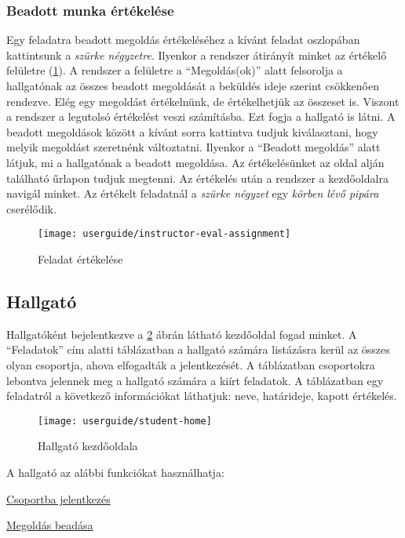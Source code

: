 \subsubsection{Beadott munka értékelése}
\label{step:instructor-eval}
Egy feladatra beadott megoldás értékeléséhez a kívánt feladat oszlopában kattintsunk a \emph{szürke négyzetre}. Ilyenkor a rendszer átirányít minket az értékelő felületre (\ref{fig:instructor-eval-assignment}). A rendszer a felületre a ``Megoldás(ok)'' alatt felsorolja a hallgatónak az összes beadott megoldását a beküldés ideje szerint csökkenően rendezve. Elég egy megoldást értékelnünk, de értékelhetjük az összeset is. Viszont a rendszer a legutolsó értékelést veszi számításba. Ezt fogja a hallgató is látni. A beadott megoldások között a kívánt sorra kattintva tudjuk kiválasztani, hogy melyik megoldást szeretnénk változtatni. Ilyenkor a ``Beadott megoldás'' alatt látjuk, mi a hallgatónak a beadott megoldása. Az értékelésünket az oldal alján található űrlapon tudjuk megtenni. Az értékelés után a rendszer a kezdőoldalra navigál minket. Az értékelt feladatnál a \emph{szürke négyzet} egy \emph{körben lévő pipára} cserélődik.
\begin{figure}[H]
	\centering
	\texttt{[image: userguide/instructor-eval-assignment]}
	\caption{Feladat értékelése}
	\label{fig:instructor-eval-assignment}
\end{figure}
\subsection{Hallgató}
\label{step:student-role}
Hallgatóként bejelentkezve a \ref{fig:student-home} ábrán látható kezdőoldal fogad minket. A ``Feladatok'' cím alatti táblázatban a hallgató számára listázásra kerül az összes olyan csoportja, ahova elfogadták a jelentkezését. A táblázatban csoportokra lebontva jelennek meg a hallgató számára a kiírt feladatok. A táblázatban egy feladatról a következő információkat láthatjuk: neve, határideje, kapott értékelés.
\begin{figure}[H]
	\centering
	\texttt{[image: userguide/student-home]}
	\caption{Hallgató kezdőoldala}
	\label{fig:student-home}
\end{figure}
A hallgató az alábbi funkciókat használhatja:
\begin{compactitem}
    \item \hyperref[step:student-course-reg]{Csoportba jelentkezés}
	\item \hyperref[step:student-solution]{Megoldás beadása}
\end{compactitem}
